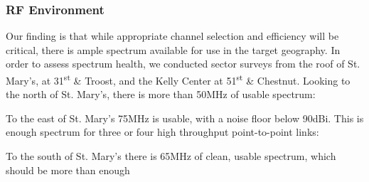 \subsubsection{RF Environment}

Our finding is that while appropriate channel selection and efficiency will be critical,
there is ample spectrum available for use in the target geography. In order to
assess spectrum health, we conducted sector surveys from the roof of St. Mary's, at 31\textsuperscript{st}
\& Troost, and the Kelly Center at 51\textsuperscript{st} \& Chestnut. Looking to the north of St. Mary's,
there is more than 50MHz of usable spectrum:\par
\begin{center}
\end{center}
To the east of St. Mary's 75MHz is usable, with a noise floor below 90dBi. This is enough spectrum
for three or four high throughput point-to-point links:
\begin{center}
\end{center}
To the south of St. Mary's there is 65MHz of clean, usable spectrum, which should be more than enough

